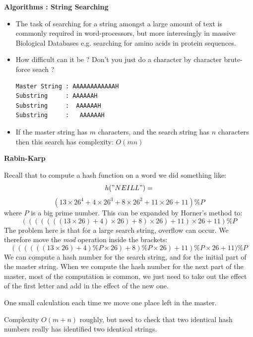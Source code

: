 \newpage
{\samepage
\begin{center}
{\Large{\bf Algorithms : String Searching}}
\end{center}
\begin{itemize}
\item The task of searching for a string amongst a large
amount of text is commonly required in word-processors,
but more interesingly in massive Biological Databases e.g.
searching for amino acids in protein sequences.
\item How difficult can it be ? Don't you just do a character by
character brute-force seach ?
\begin{verbatim}
Master String : AAAAAAAAAAAAH
Substring     : AAAAAAH
Substring     :  AAAAAAH
Substring     :   AAAAAAH
\end{verbatim}
\item If the master string has $m$ characters, and the search string
has $n$ characters then this search has complexity:
$O(mn)$
\end{itemize}
}

\newpage
{\samepage
\begin{center}
{\Large{\bf Rabin-Karp}}
\end{center}
{\small
Recall that to compute a hash function on a word we did something like:
\[
h("NEILL") =
\]
{\small
\[
(13\times26^4 + 4\times26^3 + 8\times26^2 + 11\times26 + 11) \% P
\]
}
where $P$ is a big prime number.
This can be expanded by Horner's method to:
{\small
\[
(((((((13\times26)+ 4)\times26) + 8)\times26) + 11)\times26 + 11) \% P
\]
}
The problem here is that for a large search string, overflow can occur.
We therefore move the {\it mod} operation inside the brackets:
{\small
\[
((((((13\times26)+ 4)\%P \times26) + 8)\%P \times26) + 11)\%P \times26 + 11) \% P
\]
}
We can compute a hash number for the search string, and for the initial
part of the master string.
When we compute the hash number for the next part of the master, most
of the computation is common, we just need to take out the effect of the first letter and add in the effect of the new one.

One small calculation each time we move one place left in the master.

Complexity $O(m+n)$ roughly, but need to check that two identical hash
numbers really has identified two identical strings.
}}

